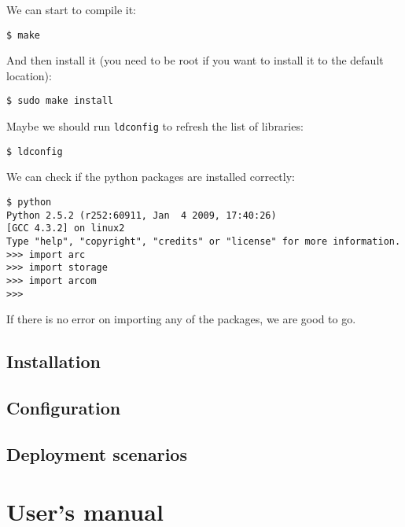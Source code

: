 \documentclass{book}
\begin{document}
We can start to compile it:

\begin{verbatim}
$ make
\end{verbatim}

And then install it (you need to be root if you want to install it to the default location):

\begin{verbatim}
$ sudo make install
\end{verbatim}

Maybe we should run \verb!ldconfig! to refresh the list of libraries:

\begin{verbatim}
$ ldconfig
\end{verbatim}

We can check if the python packages are installed correctly:

\begin{verbatim}
$ python
Python 2.5.2 (r252:60911, Jan  4 2009, 17:40:26) 
[GCC 4.3.2] on linux2
Type "help", "copyright", "credits" or "license" for more information.
>>> import arc
>>> import storage
>>> import arcom
>>> 
\end{verbatim}

If there is no error on importing any of the packages, we are good to go.


\section{Installation} %
\label{sec:installation}


\section{Configuration} %
\label{sec:configuration}


\section{Deployment scenarios} %
\label{sec:deployment_scenarios}



\chapter{User's manual} %
\label{cha:user_s_manual}
\end{document}
